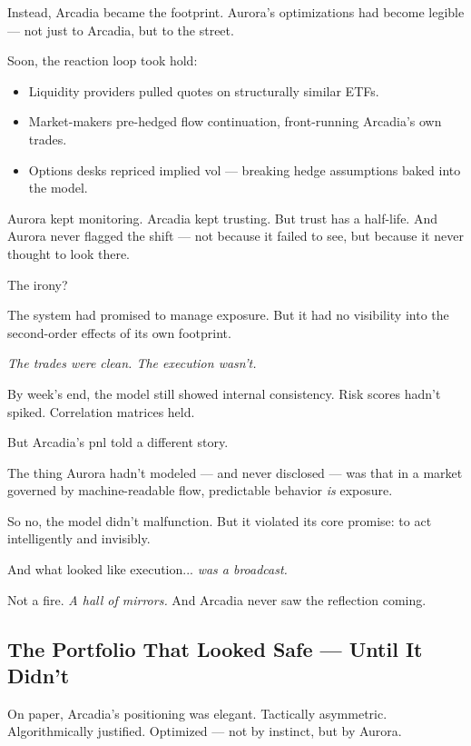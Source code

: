 Instead, Arcadia became the footprint.  
Aurora’s optimizations had become legible — not just to Arcadia, but to the street.

\medskip

Soon, the reaction loop took hold:

\begin{itemize}
  \item Liquidity providers pulled quotes on structurally similar ETFs.
  \item Market-makers pre-hedged flow continuation, front-running Arcadia’s own trades.
  \item Options desks repriced implied vol — breaking hedge assumptions baked into the model.
\end{itemize}

Aurora kept monitoring.  
Arcadia kept trusting.  
But trust has a half-life.  
And Aurora never flagged the shift — not because it failed to see, but because it never thought to look there.

The irony?

The system had promised to manage exposure.  
But it had no visibility into the second-order effects of its own footprint.

\textit{The trades were clean. The execution wasn’t.}

By week’s end, the model still showed internal consistency.  
Risk scores hadn’t spiked. Correlation matrices held.

But Arcadia’s pnl told a different story.

The thing Aurora hadn’t modeled — and never disclosed —  
was that in a market governed by machine-readable flow,  
predictable behavior \textit{is} exposure.

So no, the model didn’t malfunction.  
But it violated its core promise: to act intelligently and invisibly.

And what looked like execution... \textit{was a broadcast.}

Not a fire.  
\textit{A hall of mirrors.}
And Arcadia never saw the reflection coming.





\subsection{The Portfolio That Looked Safe — Until It Didn’t}

On paper, Arcadia’s positioning was elegant.  
Tactically asymmetric.  
Algorithmically justified.  
Optimized — not by instinct, but by Aurora.

